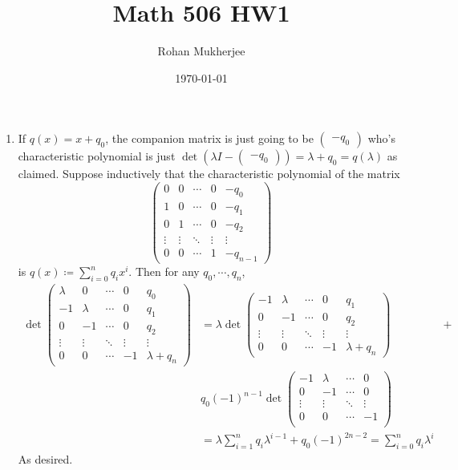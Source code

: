\documentclass[12pt]{article}
\title{Math 506 HW1}
\date{\today}
\author{Rohan Mukherjee}
\theoremstyle{definitionstyle}
\begin{document}
	\maketitle
	\begin{enumerate}
		\item If $q(x) = x + q_0$, the companion matrix is just going to be $\begin{pmatrix} -q_0 \end{pmatrix}$ who's characteristic polynomial is just $\det(\lambda I - \begin{pmatrix} -q_0 \end{pmatrix}) = \lambda + q_0 = q(\lambda)$ as claimed. Suppose inductively that the characteristic polynomial of the matrix
		$$\begin{pmatrix}
			0 & 0 & \cdots & 0 & -q_0 \\
			1 & 0 & \cdots & 0 & -q_1 \\
			0 & 1 & \cdots & 0 & -q_2 \\
			\vdots & \vdots & \ddots & \vdots & \vdots \\
			0 & 0 & \cdots & 1 & -q_{n-1}
		\end{pmatrix}$$
		is $q(x) \coloneqq \sum_{i=0}^n q_ix^i$. Then for any $q_0, \cdots, q_{n}$,
		\begin{align*}
			\det\begin{pmatrix}
				\lambda & 0 & \cdots & 0 & q_0 \\
				-1 & \lambda & \cdots & 0 & q_1 \\
				0 & -1 & \cdots & 0 & q_2 \\
				\vdots & \vdots & \ddots & \vdots & \vdots \\
				0 & 0 & \cdots & -1 & \lambda+q_{n}
			\end{pmatrix} &= \lambda \det 
			\begin{pmatrix}
				-1 & \lambda & \cdots & 0 & q_1 \\
				0 & -1 & \cdots & 0 & q_2 \\
				\vdots & \vdots & \ddots & \vdots & \vdots \\
				0 & 0 & \cdots & -1 & \lambda+q_{n}
			\end{pmatrix} &+ \\
			&q_0(-1)^{n-1}\det
			\begin{pmatrix}
				-1 & \lambda & \cdots & 0 \\
				0 & -1 & \cdots & 0 \\
				\vdots & \vdots & \ddots & \vdots \\
				0 & 0 & \cdots & -1 \\
			\end{pmatrix} \\
		&= \lambda \sum_{i=1}^n q_i\lambda^{i-1} + q_0(-1)^{2n-2} = \sum_{i=0}^n q_i\lambda^i
		\end{align*}
		As desired.
		

\end{enumerate}
\end{document}
